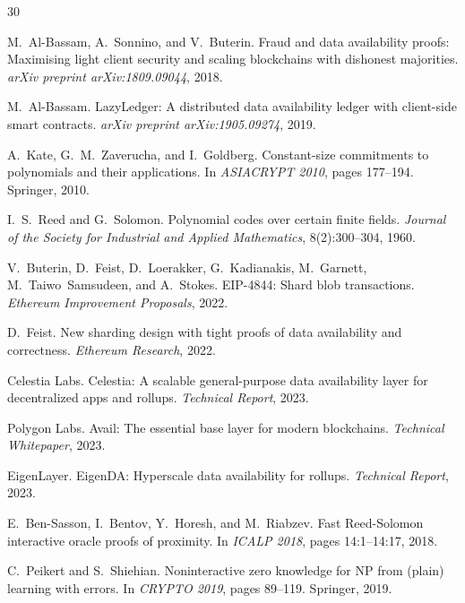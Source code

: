 \documentclass[11pt,a4paper]{article}
\theoremstyle{plain}
\theoremstyle{definition}
\theoremstyle{remark}
\begin{document}
\newpage

\begin{thebibliography}{30}

M.~Al-Bassam, A.~Sonnino, and V.~Buterin.
\newblock Fraud and data availability proofs: Maximising light client security
  and scaling blockchains with dishonest majorities.
\newblock \emph{arXiv preprint arXiv:1809.09044}, 2018.

M.~Al-Bassam.
\newblock LazyLedger: A distributed data availability ledger with client-side
  smart contracts.
\newblock \emph{arXiv preprint arXiv:1905.09274}, 2019.

A.~Kate, G.~M.~Zaverucha, and I.~Goldberg.
\newblock Constant-size commitments to polynomials and their applications.
\newblock In \emph{ASIACRYPT 2010}, pages 177--194. Springer, 2010.

I.~S.~Reed and G.~Solomon.
\newblock Polynomial codes over certain finite fields.
\newblock \emph{Journal of the Society for Industrial and Applied Mathematics},
  8(2):300--304, 1960.

V.~Buterin, D.~Feist, D.~Loerakker, G.~Kadianakis, M.~Garnett, M.~Taiwo~Samsudeen, and A.~Stokes.
\newblock EIP-4844: Shard blob transactions.
\newblock \emph{Ethereum Improvement Proposals}, 2022.

D.~Feist.
\newblock New sharding design with tight proofs of data availability and
  correctness.
\newblock \emph{Ethereum Research}, 2022.

Celestia Labs.
\newblock Celestia: A scalable general-purpose data availability layer for
  decentralized apps and rollups.
\newblock \emph{Technical Report}, 2023.

Polygon Labs.
\newblock Avail: The essential base layer for modern blockchains.
\newblock \emph{Technical Whitepaper}, 2023.

EigenLayer.
\newblock EigenDA: Hyperscale data availability for rollups.
\newblock \emph{Technical Report}, 2023.

E.~Ben-Sasson, I.~Bentov, Y.~Horesh, and M.~Riabzev.
\newblock Fast Reed-Solomon interactive oracle proofs of proximity.
\newblock In \emph{ICALP 2018}, pages 14:1--14:17, 2018.

C.~Peikert and S.~Shiehian.
\newblock Noninteractive zero knowledge for NP from (plain) learning with
  errors.
\newblock In \emph{CRYPTO 2019}, pages 89--119. Springer, 2019.


\end{thebibliography}
\end{document}
